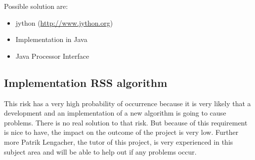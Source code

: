 Possible solution are:
\begin{itemize}
\item jython (\url{http://www.jython.org})
\item Implementation in Java
\item Java Processor Interface 
\end{itemize}


\subsection{Implementation RSS algorithm}

This risk has a very high probability of occurrence because it is very likely that a development and an implementation of a new algorithm is going to cause problems. There is no real solution to that risk. But because of this requirement is nice to have, the impact on the outcome of the project is very low. Further more Patrik Lengacher, the tutor of this project, is very experienced in this subject area and will be able to help out if any problems occur.

\
